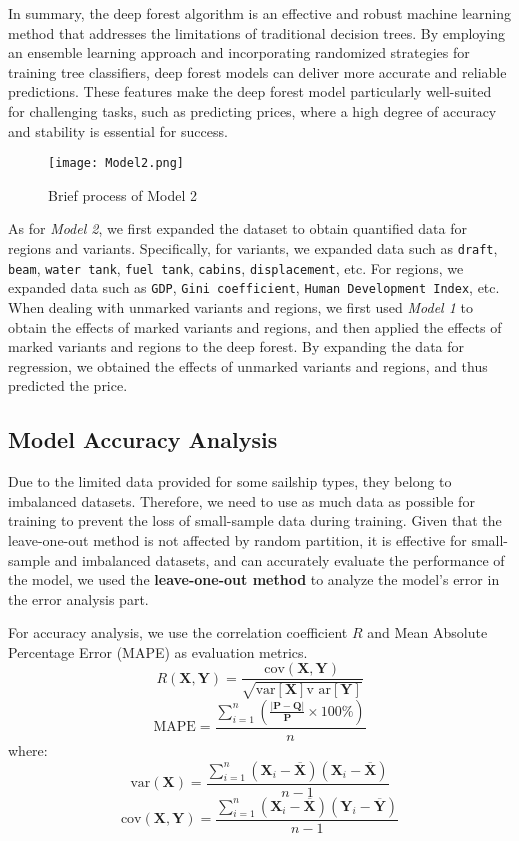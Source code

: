 \documentclass[12pt]{article}  %
\begin{document}
In summary, the deep forest algorithm is an effective and robust machine learning method that addresses the limitations of traditional decision trees. By employing an ensemble learning approach and incorporating randomized strategies for training tree classifiers, deep forest models can deliver more accurate and reliable predictions. These features make the deep forest model particularly well-suited for challenging tasks, such as predicting prices, where a high degree of accuracy and stability is essential for success.

\begin{figure}[htbp]
    \centering
    \texttt{[image: Model2.png]}
    \caption{Brief process of Model 2}\label{fig:Model2}
\end{figure}

As for \emph{Model 2}, we first expanded the dataset to obtain quantified data for regions and variants.
Specifically, for variants, we expanded data such as \texttt{draft}, \texttt{beam}, \texttt{water tank}, \texttt{fuel tank}, \texttt{cabins}, \texttt{displacement}, etc. 
For regions, we expanded data such as \texttt{GDP}, \texttt{Gini coefficient}, \texttt{Human Development Index}, etc. 
When dealing with unmarked variants and regions, we first used \emph{Model 1} to obtain the effects of marked variants and regions, and then applied the effects of marked variants and regions to the deep forest. 
By expanding the data for regression, we obtained the effects of unmarked variants and regions, and thus predicted the price.


\subsection{Model Accuracy Analysis}
Due to the limited data provided for some sailship types, 
they belong to imbalanced datasets. 
Therefore, we need to use as much data as possible for training to prevent the loss of small-sample data during training. 
Given that the leave-one-out method is not affected by random partition, 
it is effective for small-sample and imbalanced datasets, 
and can accurately evaluate the performance of the model, 
we used the \textbf{leave-one-out method} to analyze the model's error in the error analysis part.



For accuracy analysis, we use the correlation coefficient $R$ and Mean Absolute Percentage Error (MAPE) as evaluation metrics.
$$R(\textbf{X},\textbf{Y})=\frac{\text{cov}(\textbf{X},\textbf{Y})}{\sqrt{\text{var}[\textbf{X}] \text{v         ar}[\textbf{Y}]}}$$
$$\text{MAPE} = \frac{\sum_{i = 1}^n (\frac{|\textbf{P} - \textbf{Q}|}{\textbf{P}} \times 100\%)}{n}$$
where:
    $$\text{var}(\textbf{X})=\frac{\sum_{i=1}^{n}(\textbf{X}_i-\overline{\textbf{X}})(\textbf{X}_i-\overline{\textbf{X}})}{n-1}$$
    $$\text{cov}(\textbf{X},\textbf{Y})=\frac{\sum_{i=1}^{n}(\textbf{X}_i-\overline{\textbf{X}})(\textbf{Y}_i-\overline{\textbf{Y}})}{n-1}$$
\end{document}
